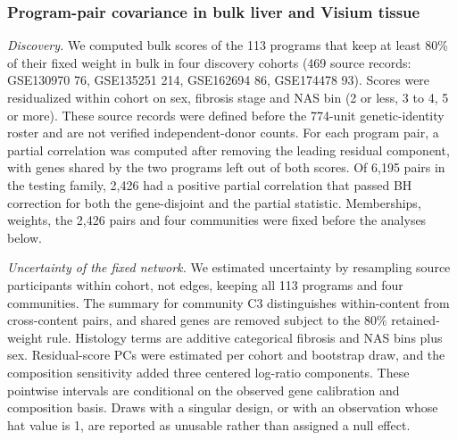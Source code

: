 \subsubsection{Program-pair covariance in bulk liver and Visium tissue}\label{program-pair-covariance-in-bulk-liver-and-visium-tissue}

\emph{Discovery.} We computed bulk scores of the 113 programs that keep at least 80\% of their fixed weight in bulk in four discovery cohorts (469 source records: GSE130970 76, GSE135251 214, GSE162694 86, GSE174478 93). Scores were residualized within cohort on sex, fibrosis stage and NAS bin (2 or less, 3 to 4, 5 or more). These source records were defined before the 774-unit genetic-identity roster and are not verified independent-donor counts. For each program pair, a partial correlation was computed after removing the leading residual component, with genes shared by the two programs left out of both scores. Of 6,195 pairs in the testing family, 2,426 had a positive partial correlation that passed BH correction for both the gene-disjoint and the partial statistic. Memberships, weights, the 2,426 pairs and four communities were fixed before the analyses below.

\emph{Uncertainty of the fixed network.} We estimated uncertainty by resampling source participants within cohort, not edges, keeping all 113 programs and four communities. The summary for community C3 distinguishes within-content from cross-content pairs, and shared genes are removed subject to the 80\% retained-weight rule. Histology terms are additive categorical fibrosis and NAS bins plus sex. Residual-score PCs were estimated per cohort and bootstrap draw, and the composition sensitivity added three centered log-ratio components. These pointwise intervals are conditional on the observed gene calibration and composition basis. Draws with a singular design, or with an observation whose hat value is 1, are reported as unusable rather than assigned a null effect.

